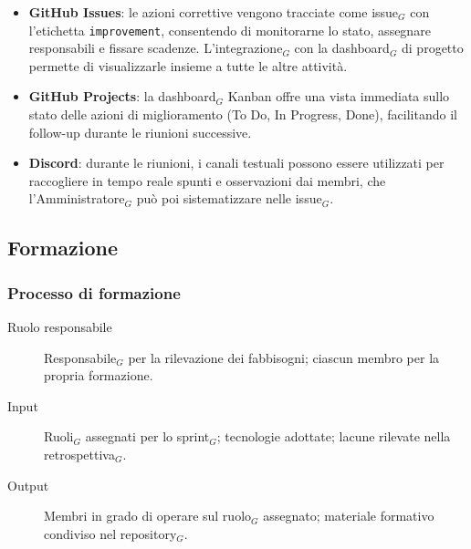 \documentclass[a4paper, 10pt]{article}
\begin{document}
\begin{itemize}
    \item \textbf{GitHub Issues}: le azioni correttive vengono tracciate come issue$_G$ con l'etichetta \texttt{improvement}, consentendo di monitorarne lo stato, assegnare responsabili e fissare scadenze. L'integrazione$_G$ con la dashboard$_G$ di progetto permette di visualizzarle insieme a tutte le altre attività.
    
    \item \textbf{GitHub Projects}: la dashboard$_G$ Kanban offre una vista immediata sullo stato delle azioni di miglioramento (To Do, In Progress, Done), facilitando il follow-up durante le riunioni successive.
        
    \item \textbf{Discord}: durante le riunioni, i canali testuali possono essere utilizzati per raccogliere in tempo reale spunti e osservazioni dai membri, che l'Amministratore$_G$ può poi sistematizzare nelle issue$_G$.
    
\end{itemize}

\subsection{Formazione}
\label{subsec:formazione}

\subsubsection{Processo di formazione}
\label{subsubsec:processo_formazione}

\begin{description}
    \item[Ruolo responsabile] Responsabile$_G$ per la rilevazione dei fabbisogni; ciascun membro per la propria formazione.
    \item[Input] Ruoli$_G$ assegnati per lo sprint$_G$; tecnologie adottate; lacune rilevate nella retrospettiva$_G$.
    \item[Output] Membri in grado di operare sul ruolo$_G$ assegnato; materiale formativo condiviso nel repository$_G$.
\end{description}
\end{document}
